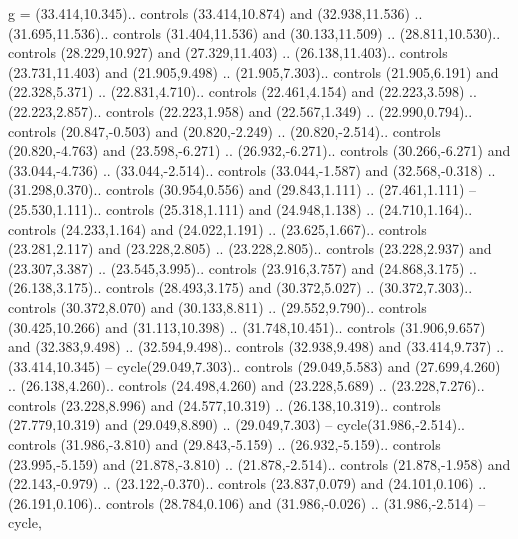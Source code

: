 {g} = {(33.414,10.345).. controls (33.414,10.874) and (32.938,11.536) .. (31.695,11.536).. controls (31.404,11.536) and (30.133,11.509) .. (28.811,10.530).. controls (28.229,10.927) and (27.329,11.403) .. (26.138,11.403).. controls (23.731,11.403) and (21.905,9.498) .. (21.905,7.303).. controls (21.905,6.191) and (22.328,5.371) .. (22.831,4.710).. controls (22.461,4.154) and (22.223,3.598) .. (22.223,2.857).. controls (22.223,1.958) and (22.567,1.349) .. (22.990,0.794).. controls (20.847,-0.503) and (20.820,-2.249) .. (20.820,-2.514).. controls (20.820,-4.763) and (23.598,-6.271) .. (26.932,-6.271).. controls (30.266,-6.271) and (33.044,-4.736) .. (33.044,-2.514).. controls (33.044,-1.587) and (32.568,-0.318) .. (31.298,0.370).. controls (30.954,0.556) and (29.843,1.111) .. (27.461,1.111) -- (25.530,1.111).. controls (25.318,1.111) and (24.948,1.138) .. (24.710,1.164).. controls (24.233,1.164) and (24.022,1.191) .. (23.625,1.667).. controls (23.281,2.117) and (23.228,2.805) .. (23.228,2.805).. controls (23.228,2.937) and (23.307,3.387) .. (23.545,3.995).. controls (23.916,3.757) and (24.868,3.175) .. (26.138,3.175).. controls (28.493,3.175) and (30.372,5.027) .. (30.372,7.303).. controls (30.372,8.070) and (30.133,8.811) .. (29.552,9.790).. controls (30.425,10.266) and (31.113,10.398) .. (31.748,10.451).. controls (31.906,9.657) and (32.383,9.498) .. (32.594,9.498).. controls (32.938,9.498) and (33.414,9.737) .. (33.414,10.345) -- cycle(29.049,7.303).. controls (29.049,5.583) and (27.699,4.260) .. (26.138,4.260).. controls (24.498,4.260) and (23.228,5.689) .. (23.228,7.276).. controls (23.228,8.996) and (24.577,10.319) .. (26.138,10.319).. controls (27.779,10.319) and (29.049,8.890) .. (29.049,7.303) -- cycle(31.986,-2.514).. controls (31.986,-3.810) and (29.843,-5.159) .. (26.932,-5.159).. controls (23.995,-5.159) and (21.878,-3.810) .. (21.878,-2.514).. controls (21.878,-1.958) and (22.143,-0.979) .. (23.122,-0.370).. controls (23.837,0.079) and (24.101,0.106) .. (26.191,0.106).. controls (28.784,0.106) and (31.986,-0.026) .. (31.986,-2.514) -- cycle},
